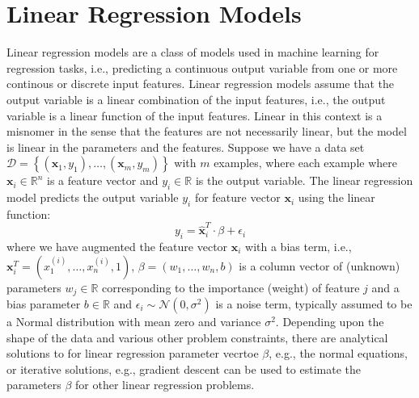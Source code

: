 \documentclass{article}[11pt]
\def\R{\mathbb{R}}
\begin{document}
\section{Linear Regression Models}
Linear regression models are a class of models used in machine learning for regression tasks, i.e., predicting a continuous output variable from one or more continous or discrete input features.
Linear regression models assume that the output variable is a linear combination of the input features, i.e., the output variable is a linear function of the input features.
Linear in this context is a misnomer in the sense that the features are not necessarily linear, but the model is linear in the parameters and the features.
Suppose we have a data set $\mathcal{D} = \left\{(\mathbf{x}_{1},y_{1}),\dotsc,(\mathbf{x}_{m},y_{m})\right\}$ with $m$ examples, where each example where $\mathbf{x}_{i}\in\R^{n}$ is a feature vector and $y_{i}\in\R$ is the output variable.
The linear regression model predicts the output variable $y_{i}$ for feature vector $\mathbf{x}_{i}$ using the linear function:
\begin{equation*}
    y_{i} = \hat{\mathbf{x}}_{i}^{T}\cdot\beta + \epsilon_{i}
\end{equation*}
where we have augmented the feature vector $\mathbf{x}_{i}$ with a bias term, i.e., $\mathbf{x}_{i}^{T} = \left(x^{(i)}_{1},\dots,x^{(i)}_{n},1\right)$, $\beta = \left(w_{1},\dots,w_{n},b\right)$ is a column vector of (unknown) parameters $w_{j}\in\R$ corresponding to the importance (weight) of feature $j$ and a bias parameter $b\in\R$
and $\epsilon_{i}\sim\mathcal{N}(0,\sigma^{2})$ is a noise term, typically assumed to be a Normal distribution with mean zero and variance $\sigma^{2}$.
Depending upon the shape of the data and various other problem constraints, there are analytical solutions to for linear regression parameter vecrtoe $\beta$, e.g., the normal equations, or iterative solutions, e.g., gradient descent can be used to estimate the parameters $\beta$ for other linear regression problems.
\end{document}
